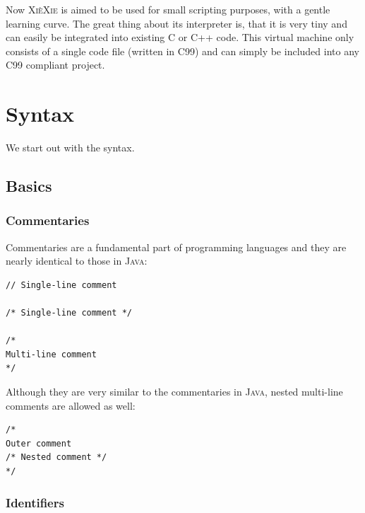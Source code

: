 \documentclass{report}
\def\xiexie{\textsc{Xi\`eXie}\xspace}
\def\cpp{\textsc{C++}\xspace}
\def\java{\textsc{Java}\xspace}
\begin{document}
Now \xiexie is aimed to be used for small scripting purposes, with a gentle learning curve.
The great thing about its interpreter is, that it is very tiny and can easily be integrated into
existing \textsc{C} or \cpp code. This virtual machine only consists of a single code file (written in \textsc{C99})
and can simply be included into any \textsc{C99} compliant project.



\chapter{Syntax}

We start out with the syntax.



\section{Basics}

\subsection{Commentaries}

Commentaries are a fundamental part of programming languages and they are nearly identical to those
in \java:
\begin{lstlisting}
// Single-line comment

/* Single-line comment */

/*
Multi-line comment
*/
\end{lstlisting}
Although they are very similar to the commentaries in \java, nested multi-line comments are allowed as well:
\begin{lstlisting}
/*
Outer comment
/* Nested comment */
*/
\end{lstlisting}

\subsection{Identifiers}
\end{document}
